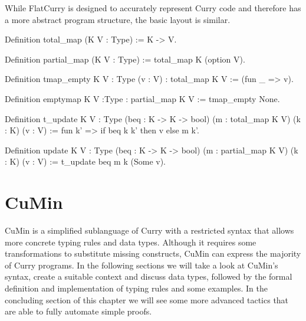 \documentclass[fleqn]{scrreprt}
\begin{document}
\par
While FlatCurry is designed to accurately represent Curry code and therefore has a more abstract program structure, the basic layout is similar. 
\begin{coqcode}
Definition total_map (K V : Type) := K -> V.

Definition partial_map (K V : Type) := total_map K (option V).

Definition tmap_empty {K V : Type} (v : V) : total_map K V := (fun _ => v).

Definition emptymap {K V :Type} : partial_map K V := tmap_empty None.

Definition t_update {K V : Type} (beq : K -> K -> bool) (m : total_map K V) (k : K) (v : V) :=
fun k' => if beq k k' then v else m k'.

Definition update {K V : Type} (beq : K -> K -> bool) (m : partial_map K V) (k : K) (v : V) :=
t_update beq m k (Some v).
\end{coqcode}
\chapter{CuMin}
CuMin is a simplified sublanguage of Curry with a restricted syntax that allows more concrete typing rules and data types. Although it requires some transformations to substitute missing constructs, CuMin can express the majority of Curry programs. In the following sections we will take a look at CuMin's syntax\cite{p19mehner}, create a suitable context and discuss data types, followed by the formal definition and implementation of typing rules and some examples. In the concluding section of this chapter we will see some more advanced tactics that are able to fully automate simple proofs.
\end{document}
